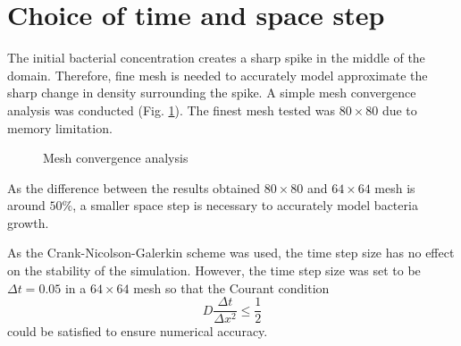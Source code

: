 \documentclass[11pt, a4paper]{article}
\begin{document}
  \section{Choice of time and space step}
  The initial bacterial concentration creates a sharp spike in the middle of 
  the domain. Therefore, fine mesh is needed to accurately model approximate 
  the sharp change in density surrounding the spike. A simple mesh convergence 
  analysis was conducted (Fig. \ref{fig:space_step}). The finest mesh tested 
  was $80 \times 80$ due to memory limitation.
  \begin{figure}[h]
    \centering
    \caption{Mesh convergence analysis \label{fig:space_step}}
  \end{figure}
  
  As the difference between the results obtained $80 \times 80$ and $64 \times 
  64$ mesh is around $50\%$, a smaller space step is necessary to accurately 
  model bacteria growth.
  
  As the Crank-Nicolson-Galerkin scheme was used, the time step size has no 
  effect on the stability of the simulation. However, the time step size was 
  set to be $\Delta t = 0.05$ in a $64 \times 64$ mesh so that the Courant 
  condition 
  \begin{equation}
  D \frac{\Delta t}{\Delta x^2} \leq \frac{1}{2}
  \end{equation}
  could be satisfied to ensure numerical accuracy.
\end{document}
